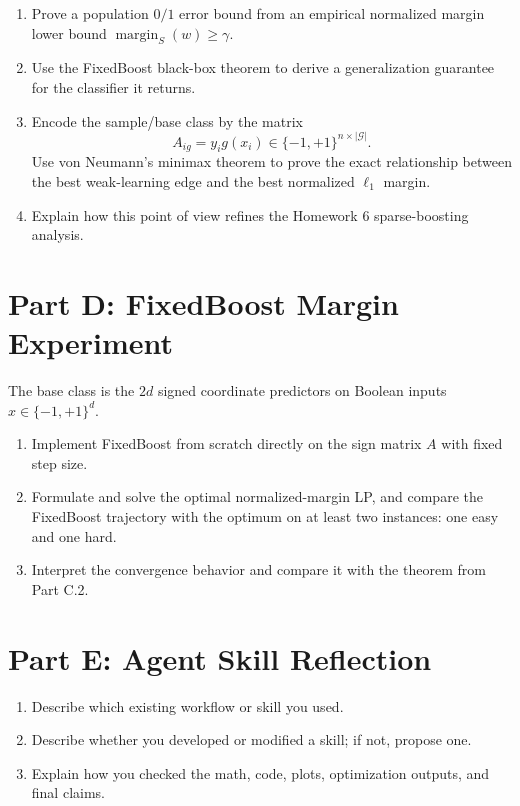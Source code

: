 \documentclass{article}
\begin{document}
\begin{enumerate}
\item Prove a population $0/1$ error bound from an empirical normalized margin lower bound $\operatorname{margin}_S(w)\ge \gamma$.
\item Use the FixedBoost black-box theorem to derive a generalization guarantee for the classifier it returns.
\item Encode the sample/base class by the matrix
$$
A_{ig}=y_i g(x_i)\in\{-1,+1\}^{n\times |\mathcal{G}|}.
$$
Use von Neumann's minimax theorem to prove the exact relationship between the best weak-learning edge and the best normalized $\ell_1$ margin.
\item Explain how this point of view refines the Homework 6 sparse-boosting analysis.
\end{enumerate}

\section{Part D: FixedBoost Margin Experiment}

The base class is the $2d$ signed coordinate predictors on Boolean inputs $x\in\{-1,+1\}^d$.

\begin{enumerate}
\item Implement FixedBoost from scratch directly on the sign matrix $A$ with fixed step size.
\item Formulate and solve the optimal normalized-margin LP, and compare the FixedBoost trajectory with the optimum on at least two instances: one easy and one hard.
\item Interpret the convergence behavior and compare it with the theorem from Part C.2.
\end{enumerate}

\section{Part E: Agent Skill Reflection}

\begin{enumerate}
\item Describe which existing workflow or skill you used.
\item Describe whether you developed or modified a skill; if not, propose one.
\item Explain how you checked the math, code, plots, optimization outputs, and final claims.
\end{enumerate}
\end{document}
